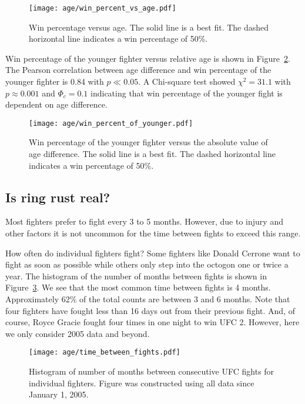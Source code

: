 \begin{figure}[h]
\begin{center}
\texttt{[image: age/win\_percent\_vs\_age.pdf]}
\caption{Win percentage versus age. The
solid line is a best fit. The dashed horizontal line indicates
a win percentage of 50\%.}
\label{win_pct_abs_age}
\end{center}
\end{figure}

Win percentage of the younger fighter versus relative age
is shown in Figure~\ref{win_pct_rel_age}.
The Pearson correlation between age difference and win percentage of the
younger fighter is 0.84 with $p \ll 0.05$. A Chi-square
test showed $\chi^2=31.1$ with $p \approx 0.001$ and $\Phi_c=0.1$ indicating that win percentage
of the younger fight is dependent on age difference.

\begin{figure}[h]
\begin{center}
\texttt{[image: age/win\_percent\_of\_younger.pdf]}
\caption{Win percentage of the younger fighter versus the absolute
value of age difference. The
solid line is a best fit. The dashed horizontal line indicates
a win percentage of 50\%.}
\label{win_pct_rel_age}
\end{center}
\end{figure}

\clearpage
\subsection*{Is ring rust real?}

Most fighters prefer to fight every 3 to 5 months. However, due to injury
and other factors
it is not uncommon
for the time between fights to exceed this range.

How often do individual fighters fight? Some fighters like Donald Cerrone
want to fight as soon as possible while others only step
into the octogon one or twice a year. The histogram of the number of months
between fights is shown in Figure~\ref{time_between_fights}. We see that the most
common time between fights is 4 months. 
Approximately 62\% of the total counts are between 3 and 6 months.
Note that four fighters have fought less than 16 days out from their
previous fight. And, of course, Royce Gracie fought four times in one night
to win UFC 2. However, here we only consider 2005 data and beyond.

\begin{figure}[h]
\begin{center}
\texttt{[image: age/time\_between\_fights.pdf]}
\caption{Histogram of number of months between consecutive UFC fights
for individual fighters. Figure was constructed using all data since
January 1, 2005.}
\label{time_between_fights}
\end{center}
\end{figure}

